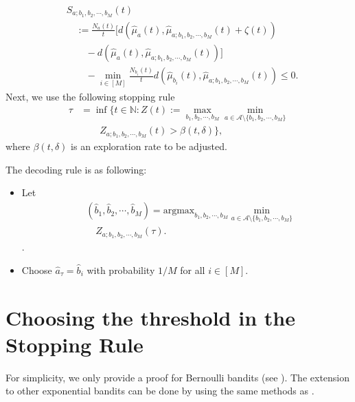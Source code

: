 \documentclass[final]{IEEEtran}
\newcommand{\nn}{\nonumber}
\newcommand{\calA}{\mathcal{A}}
\newcommand{\bbN}{\mathbb{N}}
\begin{document}
\begin{align}
&S_{a;b_1,b_2,\cdots,b_M}(t)\nn\\
&\quad := \frac{N_a(t)}{t} \big[d(\hat{\mu}_a(t),\hat{\mu}_{a;b_1,b_2,\cdots,b_M}(t)+\zeta(t))\nn\\
&\qquad - d(\hat{\mu}_a(t),\hat{\mu}_{a;b_1,b_2,\cdots,b_M}(t))\big]\nn\\
&\qquad  -\min_{i \in [M]} \frac{N_{b_i}(t)}{t} d(\hat{\mu}_{b_i}(t),\hat{\mu}_{a;b_1,b_2,\cdots,b_M}(t))\leq 0. 
\end{align}
Next, we use the following stopping rule
\begin{align}
\tau
&=\inf\bigg\{t \in \bbN: Z(t):= \max_{b_1,b_2,\cdots,b_M}\min_{a \in  \calA \setminus \{b_1,b_2,\cdots,b_M\}}  \nn\\
&\qquad Z_{a;b_1,b_2,\cdots,b_M}(t)>\beta(t,\delta)\bigg\},
\end{align} where $\beta(t,\delta)$ is an exploration rate to be adjusted. 

The decoding rule is as following:
\begin{itemize}
\item Let 
\begin{align}
&(\hat{b}_1,\hat{b}_2,\cdots,\hat{b}_M)=\text{argmax}_{b_1,b_2,\cdots,b_M} \min_{a \in \calA \setminus \{b_1,b_2,\cdots,b_M\}} \nn\\
&\quad Z_{a;b_1,b_2,\cdots,b_M}(\tau).
\end{align}.
\item Choose $\hat{a}_{\tau}=\hat{b}_i$ with probability $1/M$ for all $i \in [M]$. 
\end{itemize} 
\section{Choosing the threshold in the Stopping Rule}
For simplicity, we only provide a proof for Bernoulli bandits (see \cite{garivier2016optimal}). The extension to other exponential bandits can be done by using the same methods as \cite{Chambaz2005AMA}.
\end{document}

